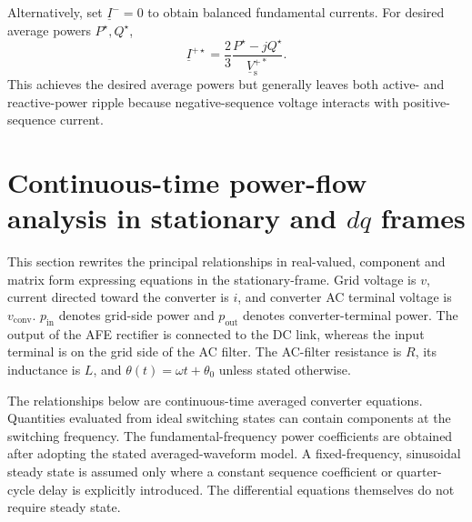 Alternatively, set \(\underline I^-=0\) to obtain balanced fundamental currents. For desired average powers \(P^\star,Q^\star\),
\begin{equation}\label{eq:balanced}
\underline I^{+\star}=\frac{2}{3}\frac{P^\star-jQ^\star}{\underline V_{\mathrm{s}}^{+*}}.
\end{equation}
This achieves the desired average powers but generally leaves both active- and reactive-power ripple because negative-sequence voltage interacts with positive-sequence current.

\section{Continuous-time power-flow analysis in stationary and \(dq\) frames}
\label{sec:li_wu_continuous}
This section rewrites the principal relationships in real-valued, component and matrix form expressing equations in the stationary-frame. Grid voltage is \(v\), current directed toward the converter is \(i\), and converter AC terminal voltage is \(v_{\mathrm{conv}}\). \(p_{\mathrm{in}}\) denotes grid-side power and \(p_{\mathrm{out}}\) denotes converter-terminal power. The output of the AFE rectifier is connected to the DC link, whereas the input terminal is on the grid side of the AC filter. The AC-filter resistance is \(R\), its inductance is \(L\), and \(\theta(t)=\omega t+\theta_0\) unless stated otherwise.

The relationships below are continuous-time averaged converter equations. Quantities evaluated from ideal switching states can contain components at the switching frequency. The fundamental-frequency power coefficients are obtained after adopting the stated averaged-waveform model. A fixed-frequency, sinusoidal steady state is assumed only where a constant sequence coefficient or quarter-cycle delay is explicitly introduced. The differential equations themselves do not require steady state.

